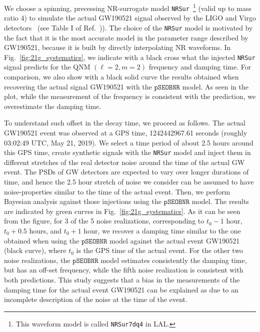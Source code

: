 \documentclass[twocolumn,prd,aps,superscriptaddress,preprintnumbers,tightenlines,showpacs,nofootinbib,eqsecnum,amsfonts,amsmath]{revtex4-1}
\newcommand{\pSEOB}{\texttt{pSEOBNR}}
\begin{document}
We choose a spinning, precessing NR-surrogate model \texttt{NRSur}~\footnote{This waveform model is 
called \texttt{NRSur7dq4} in LAL.} (valid up to mass ratio 4) to simulate the actual GW190521 signal
observed by the LIGO and Virgo detectors~\cite{Abbott:2020tfl} (see
Table I of Ref.~\cite{Abbott:2020tfl})). The choice of the
\texttt{NRSur} model is motivated by the fact that it is the most
accurate model in the parameter range described by GW190521, because 
it is built by directly interpolating NR waveforms. In
Fig.~\ref{fig:21g_systematics}, we indicate with a black cross what
the injected \texttt{NRSur} signal predicts for the QNM $(\ell=2,m=2)$
frequency and damping time. For comparison, we also show with a
black solid curve the results obtained when recovering the actual
signal GW190521 with the $\pSEOB$ model. As seen in the plot,
while the measurement of the frequency is consistent with the
prediction, we overestimate the damping time.

To understand such offset in the decay time, we proceed as follows.
The actual GW190521 event was observed at a GPS time, 1242442967.61
seconds (roughly 03:02:49 UTC, May 21, 2019). We select a time period
of about 2.5 hours around this GPS time, create synthetic signals 
with the \texttt{NRSur} model and inject them in different stretches
of the real detector noise around the time of the actual GW event. The
PSDs of GW detectors are expected to vary over longer durations of
time, and hence the 2.5 hour stretch of noise we consider can be
assumed to have noise-properties similar to the time of the actual
event. Then, we perform Bayesian analysis against those injections 
using the $\pSEOB$ model. The results are indicated by green curves in
Fig.~\ref{fig:21g_systematics}. As it can be seen from the figure, for
3 of the 5 noise realizations, corresponding to $t_0-1$ hour,
$t_0+0.5$ hours, and $t_0+1$ hour, we recover a damping time similar to
the one obtained when using the $\pSEOB$ model against the actual event GW190521 
(black curve), where $t_0$ is the GPS time of the actual event. For
the other two noise realizations, the $\pSEOB$ model estimates 
consistently the damping time, but has an off-set frequency, 
while the fifth noise realization is consistent with both predictions.  
This study suggests that a bias in the measurements of the damping time 
for the actual event GW190521 can be explained as due to an incomplete 
description of the noise at the time of the event.
\end{document}
